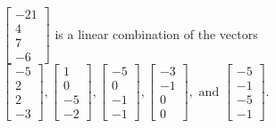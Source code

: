 \begin{exercise}
\begin{exerciseStatement}
  \end{exerciseStatement}
  \begin{exerciseAnswer}
   \(\left[\begin{array}{c}
-21 \\
4 \\
7 \\
-6
\end{array}\right]\) 
  	 is  
	a linear combination of the vectors \(\left[\begin{array}{c}
-5 \\
2 \\
2 \\
-3
\end{array}\right] , \left[\begin{array}{c}
1 \\
0 \\
-5 \\
-2
\end{array}\right] , \left[\begin{array}{c}
-5 \\
0 \\
-1 \\
-1
\end{array}\right] , \left[\begin{array}{c}
-3 \\
-1 \\
0 \\
0
\end{array}\right] , \text{ and } \left[\begin{array}{c}
-5 \\
-1 \\
-5 \\
-1
\end{array}\right]\).

	
  


  \end{exerciseAnswer}
\end{exercise}